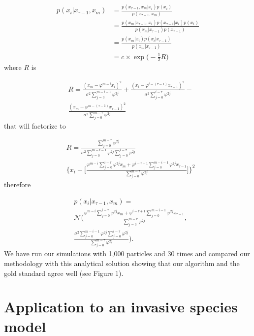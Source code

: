 \begin{align*}
    p(x_i | x_{\tau-1}, x_m) &= \frac{p(x_{\tau-1}, x_m | x_i) p(x_i)}{p(x_{\tau-1}, x_m)} \\
    &= \frac{p(x_m | x_{\tau-1}, x_i) p(x_{\tau-1} | x_i) p(x_i)}{p(x_m | x_{\tau-1}) p(x_{\tau-1})} \\
    &= \frac{p(x_m | x_i) p(x_i | x_{\tau-1})}{p(x_m | x_{\tau-1})} \\
    &= c\times \exp\Big(-\frac{1}{2} R\Big)
\end{align*}
where $R$ is

\begin{align*}
    &R = \frac{(x_m - \varphi^{m-i} x_i)^2}{\sigma^2 \sum_{j=0}^{m-i-1} \varphi^{2j}} + \frac{(x_i - \varphi^{i-(\tau-1)} x_{\tau-1})^2}{\sigma^2 \sum_{j=0}^{i-\tau} \varphi^{2j}} - \\
    &\frac{(x_m - \varphi^{m -(\tau-1)} x_{\tau-1})^2}{\sigma^2 \sum_{j=0}^{m-\tau} \varphi^{2j}}
\end{align*}
that will factorize to

\begin{align*}
    &R = \frac{\sum_{j=0}^{m-\tau} \varphi^{2j}}{\sigma^2 \sum_{j=0}^{m-t-1} \varphi^{2j} \sum_{j=0}^{i-\tau} \varphi^{2j}} \\
    &\Bigg\{ x_i - \Bigg[\frac{\varphi^{m-i} \sum_{j=0}^{i-\tau} \varphi^{2j} x_{m} + \varphi^{i-\tau+1} \sum_{j=0}^{m-i-1} \varphi^{2j} x_{\tau-1}}{\sum_{j=0}^{m-\tau} \varphi^{2j}}\Bigg] \Bigg\}^2
\end{align*}
therefore

\begin{align*}
      &p(x_i | x_{\tau-1}, x_{m}) = \\
      &\mathcal{N} \Bigg(\frac{\varphi^{m-i} \sum_{j=0}^{i-\tau} \varphi^{2j} x_{m} + \varphi^{i-\tau+1} \sum_{j=0}^{m-i-1} \varphi^{2j} x_{\tau-1}}{\sum_{j=0}^{m-\tau} \varphi^{2j}}, \\ &\frac{\sigma^2 \sum_{j=0}^{m-i-1} \varphi^{2j} \sum_{j=0}^{i-\tau} \varphi^{2j}}{\sum_{j=0}^{m-\tau} \varphi^{2j}} \Bigg).
\end{align*}
We have run our simulations with 1,000 particles and 30 times and compared our methodology with this analytical solution showing that our algorithm and the gold standard agree well (see Figure 1).

\section{Application to an invasive species model}
\label{sec:7}

